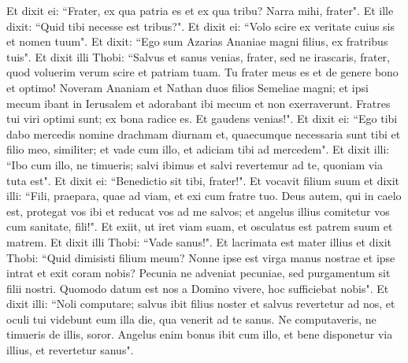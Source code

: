 \begin{biblechapter}
\verse Et dixit ei: “Frater, ex qua patria es et ex qua tribu? Narra mihi, frater". 
\verse Et ille dixit: “Quid tibi necesse est tribus?". Et dixit ei: “Volo scire ex veritate cuius sis et nomen tuum".  
\verse Et dixit: “Ego sum Azarias Ananiae magni filius, ex fratribus tuis". 
\verse Et dixit illi Thobi: “Salvus et sanus venias, frater, sed ne irascaris, frater, quod voluerim verum scire et patriam tuam. Tu frater meus es et de genere bono et optimo! Noveram Ananiam et Nathan duos filios Semeliae magni; et ipsi mecum ibant in Ierusalem et adorabant ibi mecum et non exerraverunt. Fratres tui viri optimi sunt; ex bona radice es. Et gaudens venias!". 
\verse Et dixit ei: “Ego tibi dabo mercedis nomine drachmam diurnam et, quaecumque necessaria sunt tibi et filio meo, similiter; et vade cum illo, 
\verse et adiciam tibi ad mercedem". 
\verse Et dixit illi: “Ibo cum illo, ne timueris; salvi ibimus et salvi revertemur ad te, quoniam via tuta est". Et dixit ei: “Benedictio sit tibi, frater!". Et vocavit filium suum et dixit illi: “Fili, praepara, quae ad viam, et exi cum fratre tuo. Deus autem, qui in caelo est, protegat vos ibi et reducat vos ad me salvos; et angelus illius comitetur vos cum sanitate, fili!". Et exiit, ut iret viam suam, et osculatus est patrem suum et matrem. Et dixit illi Thobi: “Vade sanus!". 
\verse Et lacrimata est mater illius et dixit Thobi: “Quid dimisisti filium meum? Nonne ipse est virga manus nostrae et ipse intrat et exit coram nobis? 
\verse Pecunia ne adveniat pecuniae, sed purgamentum sit filii nostri. 
\verse Quomodo datum est nos a Domino vivere, hoc sufficiebat nobis". 
\verse Et dixit illi: “Noli computare; salvus ibit filius noster et salvus revertetur ad nos, et oculi tui videbunt eum illa die, qua venerit ad te sanus. Ne computaveris, ne timueris de illis, soror. 
\verse Angelus enim bonus ibit cum illo, et bene disponetur via illius, et revertetur sanus". 
\end{biblechapter}

